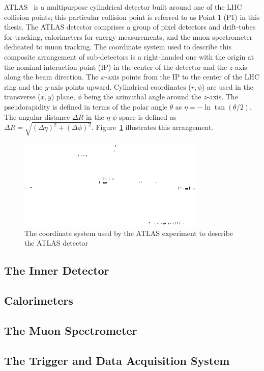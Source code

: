 ATLAS~\cite{PERF-2007-01} is a multipurpose cylindrical detector built around one 
of the LHC collision points; this particular collision point is referred to 
as Point 1 (P1) in this thesis. The ATLAS detector comprises a group of pixel detectors 
 and drift-tubes for tracking, calorimeters for energy measurements, and the muon spectrometer 
dedicated to muon tracking. The coordinate system used to describe this composite 
arrangement of sub-detectors is a right-handed one with the origin at the nominal interaction point (IP) 
in the center of the detector and the $z$-axis along the beam direction. The $x$-axis 
points from the IP to the center of the LHC ring
and the $y$-axis points upward. Cylindrical coordinates ($r,\phi$) are used in the transverse ($x,y$) plane,
$\phi$ being the azimuthal angle around the $z$-axis. The pseudorapidity is defined in terms of the polar angle
$\theta$ as $\eta=-\ln\tan(\theta/2)$. The angular distance $\Delta R$ in the $\eta$-$\phi$ space is defined as 
$\Delta R = \sqrt{(\Delta\eta)^2 + (\Delta\phi)^2}$. Figure~\ref{fig:coord} illustrates this arrangement.  

\begin{figure}
	\centering
   \includegraphics[width=0.8\textwidth]{figures/Figures_T_Coordinate.png}
	\caption{The coordinate system used by the ATLAS experiment to describe the ATLAS detector}
	\label{fig:coord}
\end{figure}

\subsection{The Inner Detector}
\label{sec:ID}


\subsection{Calorimeters}
\label{sec:calo}


\subsection{The Muon Spectrometer}
	\label{sec:muonSpec}


\subsection{The Trigger and Data Acquisition System}
	\label{sec:trigger}

